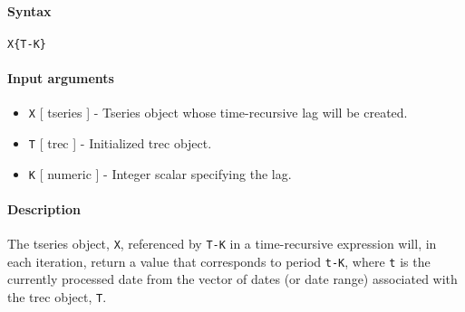 


	\paragraph{Syntax}\label{syntax}

\begin{verbatim}
X{T-K}
\end{verbatim}

\paragraph{Input arguments}\label{input-arguments}

\begin{itemize}
\item
  \texttt{X} {[} tseries {]} - Tseries object whose time-recursive lag
  will be created.
\item
  \texttt{T} {[} trec {]} - Initialized trec object.
\item
  \texttt{K} {[} numeric {]} - Integer scalar specifying the lag.
\end{itemize}

\paragraph{Description}\label{description}

The tseries object, \texttt{X}, referenced by \texttt{T-K} in a
time-recursive expression will, in each iteration, return a value that
corresponds to period \texttt{t-K}, where \texttt{t} is the currently
processed date from the vector of dates (or date range) associated with
the trec object, \texttt{T}.



